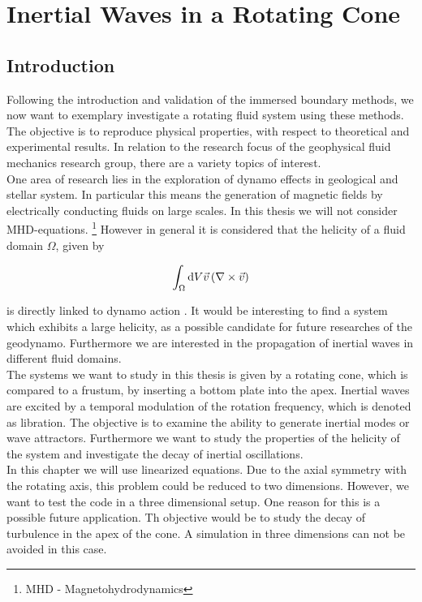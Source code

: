 \chapter{Inertial Waves in a Rotating Cone}

\section{Introduction}

Following the introduction and validation of the immersed boundary methods,
we now want to exemplary investigate a rotating fluid system using these methods.
The objective is to reproduce  physical properties, with respect to theoretical and experimental results.
In relation to the research focus of the geophysical fluid mechanics research group, there are a variety
topics of interest.\\
One area of research lies in the exploration of dynamo effects in geological and stellar system.
In particular this means the generation of magnetic fields by electrically conducting fluids on large scales.
In this thesis we will not consider MHD-equations.  \footnote{MHD - Magnetohydrodynamics}
However in general it is considered that the helicity of a fluid domain $\Omega$, given by

\begin{align}
    \int_{\Omega}\mathop{}\!\mathrm{d} V  \vec{v} \left( \nabla \times \vec{v} \right)
\end{align}

is directly linked to dynamo action \citep{moffat1978}.
It would be interesting to find a system which exhibits a large helicity,
as a possible candidate for future researches of the geodynamo.
Furthermore we are interested in the propagation of inertial waves in different fluid domains.\\
The systems we want to study in this thesis is given by a rotating cone, which is compared to
a frustum, by inserting a bottom plate into the apex.
Inertial waves are excited by a temporal modulation of the rotation frequency, which is denoted as libration.
The objective is to examine the ability to generate inertial modes or wave attractors.
Furthermore we want to study the properties of the helicity of the system and investigate the
decay of inertial oscillations.\\
In this chapter we will use linearized equations. Due to the axial symmetry with the rotating axis,
this problem could be reduced to two dimensions.
However, we want to test the code in a three dimensional setup.
One reason for this is a possible future application.
Th objective would be to study the decay of turbulence in the apex of the cone.
A simulation in three dimensions can not be avoided in this case.

